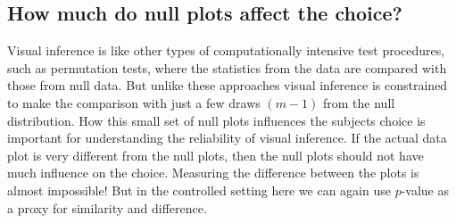 \documentclass{article}
\newcommand{\green}[1]{{\color{green} #1}} %
\begin{document}




\subsection{How much do null plots affect the choice?}

Visual inference is like other types of computationally intensive test procedures, such as permutation tests, where the statistics from the data are compared with those from null data. But unlike these approaches visual inference is constrained to make the comparison with just a few draws $(m-1)$ from the null distribution. How this small set of null plots influences the subjects choice is important for understanding the reliability of visual inference. If the actual data plot is very different from the null plots, then the null plots should not have much influence on the choice. Measuring the difference between the plots is almost impossible! But in the controlled setting here we can again use $p$-value as a proxy for similarity and difference. 
\end{document}
